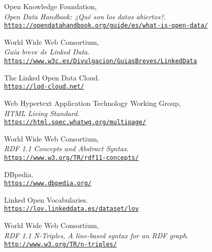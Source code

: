 
\begingroup
    \renewcommand{\section}[2]{}%
    \begin{thebibliography}{X}
    
            Open Knowledge Foundation,
            \\ \textit{Open Data Handbook: ¿Qué son los datos abiertos?}.
            \\ \texttt{\url{https://opendatahandbook.org/guide/es/what-is-open-data/}}
            
            World Wide Web Consortium,
            \\ \textit{Guía breve de Linked Data}.
            \\ \texttt{\url{https://www.w3c.es/Divulgacion/GuiasBreves/LinkedData}}
            
            The Linked Open Data Cloud.
            \\ \texttt{\url{https://lod-cloud.net/}}
            
            Web Hypertext Application Technology Working Group,
            \\ \textit{HTML Living Standard}.
            \\ \texttt{\url{https://html.spec.whatwg.org/multipage/}}
            
            World Wide Web Consortium,
            \\ \textit{RDF 1.1 Concepts and Abstract Syntax}.
            \\ \texttt{\url{https://www.w3.org/TR/rdf11-concepts/}}
        
            DBpedia.
            \\ \texttt{\url{https://www.dbpedia.org/}}
        
            Linked Open Vocabularies.
            \\ \texttt{\url{https://lov.linkeddata.es/dataset/lov}}
        
            World Wide Web Consortium,
            \\ \textit{RDF 1.1 N-Triples, A line-based syntax for an RDF graph}.
            \\ \texttt{\url{http://www.w3.org/TR/n-triples/}}
        

\end{thebibliography}
